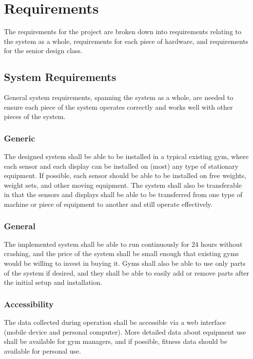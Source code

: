 \documentclass[PPFS.tex]{template/subfiles}
\begin{document}
\section{Requirements}

The requirements for the project are broken down into requirements relating to the system as a whole, requirements for each piece of hardware, and requirements for the senior design class.

\subsection{System Requirements}
General system requirements, spanning the system as a whole, are needed to ensure each piece of the system operates correctly and works well with other pieces of the system.

\subsubsection{Generic}
The designed system shall be able to be installed in a typical existing gym, where each sensor and each display can be installed on (most) any type of stationary equipment. If possible, each sensor should be able to be installed on free weights, weight sets, and other moving equipment. The system shall also be transferable in that the sensors and displays shall be able to be transferred from one type of machine or piece of equipment to another and still operate effectively.

\subsubsection{General}
The implemented system shall be able to run continuously for 24 hours without crashing, and the price of the system shall be small enough that existing gyms would be willing to invest in buying it. Gyms shall also be able to use only parts of the system if desired, and they shall be able to easily add or remove parts after the initial setup and installation.

\subsubsection{Accessibility}
The data collected during operation shall be accessible via a web interface (mobile device and personal computer). More detailed data about equipment use shall be available for gym managers, and if possible, fitness data should be available for personal use.
\end{document}
